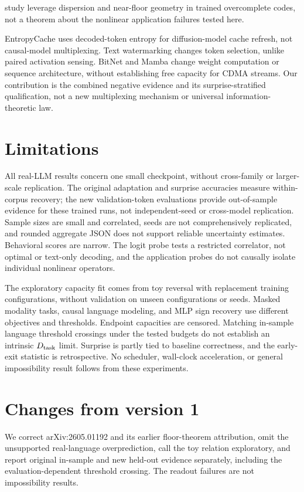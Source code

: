 \documentclass[11pt]{article}
\begin{document}
\citet{borobia2026} study leverage dispersion and near-floor geometry in trained overcomplete codes, not a theorem about the nonlinear application failures tested here.

EntropyCache \citep{cheong2026} uses decoded-token entropy for diffusion-model cache refresh, not causal-model multiplexing. Text watermarking \citep{kirchenbauer2023} changes token selection, unlike paired activation sensing. BitNet \citep{wang2023} and Mamba \citep{gu2023} change weight computation or sequence architecture, without establishing free capacity for CDMA streams. Our contribution is the combined negative evidence and its surprise-stratified qualification, not a new multiplexing mechanism or universal information-theoretic law.

\section{Limitations}
All real-LLM results concern one small checkpoint, without cross-family or larger-scale replication. The original adaptation and surprise accuracies measure within-corpus recovery; the new validation-token evaluations provide out-of-sample evidence for these trained runs, not independent-seed or cross-model replication. Sample sizes are small and correlated, seeds are not comprehensively replicated, and rounded aggregate JSON does not support reliable uncertainty estimates. Behavioral scores are narrow. The logit probe tests a restricted correlator, not optimal or text-only decoding, and the application probes do not causally isolate individual nonlinear operators.

The exploratory capacity fit comes from toy reversal with replacement training configurations, without validation on unseen configurations or seeds. Masked modality tasks, causal language modeling, and MLP sign recovery use different objectives and thresholds. Endpoint capacities are censored. Matching in-sample language threshold crossings under the tested budgets do not establish an intrinsic $D_{\rm task}$ limit. Surprise is partly tied to baseline correctness, and the early-exit statistic is retrospective. No scheduler, wall-clock acceleration, or general impossibility result follows from these experiments.

\section*{Changes from version 1}
We correct arXiv:2605.01192 and its earlier floor-theorem attribution, omit the unsupported real-language overprediction, call the toy relation exploratory, and report original in-sample and new held-out evidence separately, including the evaluation-dependent threshold crossing. The readout failures are not impossibility results.
\end{document}

